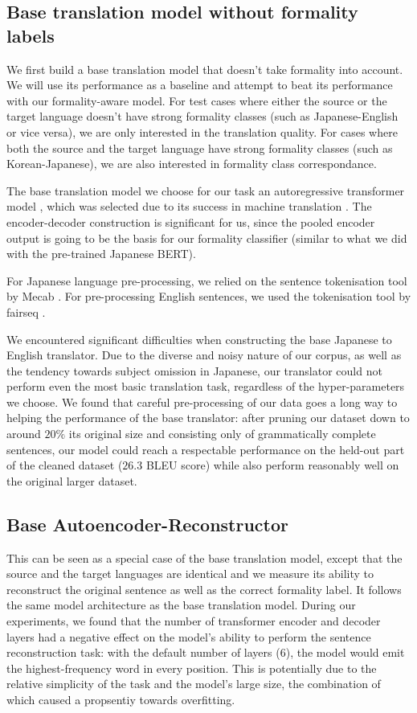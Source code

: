 \documentclass[11pt]{article}
\begin{document}
\subsection{Base translation model without formality labels}

We first build a base translation model that doesn't take formality into account. We will use its performance as a baseline and attempt to beat its performance with our formality-aware model. For test cases where either the source or the target language doesn't have strong formality classes (such as Japanese-English or vice versa), we are only interested in the translation quality. For cases where both the source and the target language have strong formality classes (such as Korean-Japanese), we are also interested in formality class correspondance.

The base translation model we choose for our task an autoregressive transformer model \cite{vaswani2017attention}, which was selected due to its success in machine translation \cite{liu2020deep}. The encoder-decoder construction is significant for us, since the pooled encoder output is going to be the basis for our formality classifier (similar to what we did with the pre-trained Japanese BERT).

For Japanese language pre-processing, we relied on the sentence tokenisation tool by Mecab \cite{Kudo2005MeCabY}. For pre-processing English sentences, we used the tokenisation tool by fairseq \cite{ott2019fairseq}.

We encountered significant difficulties when constructing the base Japanese to English translator. Due to the diverse and noisy nature of our corpus, as well as the tendency towards subject omission in Japanese, our translator could not perform even the most basic translation task, regardless of the hyper-parameters we choose. We found that careful pre-processing of our data goes a long way to helping the performance of the base translator: after pruning our dataset down to around $20\%$ its original size and consisting only of grammatically complete sentences, our model could reach a respectable performance on the held-out part of the cleaned dataset ($26.3$ BLEU score) while also perform reasonably well on the original larger dataset.

\subsection{Base Autoencoder-Reconstructor}

This can be seen as a special case of the base translation model, except that the source and the target languages are identical and we measure its ability to reconstruct the original sentence as well as the correct formality label. It follows the same model architecture as the base translation model. During our experiments, we found that the number of transformer encoder and decoder layers had a negative effect on the model's ability to perform the sentence reconstruction task: with the default number of layers ($6$), the model would emit the highest-frequency word in every position. This is potentially due to the relative simplicity of the task and the model's large size, the combination of which caused a propsentiy towards overfitting.
\end{document}
